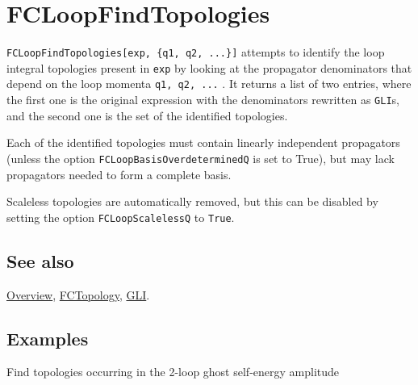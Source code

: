 \documentclass[../FeynCalcManual.tex]{subfiles}
\begin{document}
\hypertarget{fcloopfindtopologies}{
\section{FCLoopFindTopologies}\label{fcloopfindtopologies}}

\texttt{FCLoopFindTopologies[\allowbreak{}exp,\ \allowbreak{}\{\allowbreak{}q1,\ \allowbreak{}q2,\ \allowbreak{}...\}]}
attempts to identify the loop integral topologies present in
\texttt{exp} by looking at the propagator denominators that depend on
the loop momenta \texttt{q1,\ \allowbreak{}q2,\ \allowbreak{}...} . It
returns a list of two entries, where the first one is the original
expression with the denominators rewritten as \texttt{GLI}s, and the
second one is the set of the identified topologies.

Each of the identified topologies must contain linearly independent
propagators (unless the option \texttt{FCLoopBasisOverdeterminedQ} is
set to True), but may lack propagators needed to form a complete basis.

Scaleless topologies are automatically removed, but this can be disabled
by setting the option \texttt{FCLoopScalelessQ} to \texttt{True}.

\subsection{See also}

\hyperlink{toc}{Overview}, \hyperlink{fctopology}{FCTopology},
\hyperlink{gli}{GLI}.

\subsection{Examples}

Find topologies occurring in the 2-loop ghost self-energy amplitude

\begin{Shaded}
\begin{Highlighting}[]
\ExtensionTok{=} \OperatorTok{[}\OperatorTok{[\{}\OperatorTok{,} \OperatorTok{,} \OperatorTok{,} 
      \OperatorTok{,} \OperatorTok{\}]]}\NormalTok{;}
\end{Highlighting}
\end{Shaded}
\end{document}
